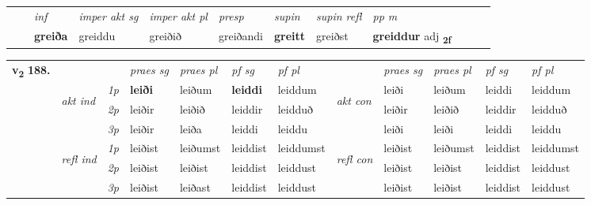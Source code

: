 \begin{tabular}{llllllllllll}
 & & \textit{inf} & \textit{imper akt sg} & \textit{imper akt pl}   & \textit{presp} & \textit{supin} & \textit{supin refl} & \textit{pp m}     \\*
  & & \textbf{greiða} & greiddu  & greiðið   & greiðandi &  \textbf{greitt} & greiðst & \textbf{greiddur} adj \textbf{\textsubscript{2f}} \\*
\cmidrule{1-12}
\end{tabular}



\begin{tabular}{llllllllllll} \toprule
\multirow{4}{*}{{{\textbf{v{\textsubscript{2}}} \Large{\textbf{188.}}}}}  & &   &  \textit{praes sg}  & \textit{praes pl}  &\textit{ pf sg} & \textit{pf pl} &  &  \textit{praes sg}  & \textit{praes pl}  & \textit{pf sg} & \textit{pf pl } \\*
	\cmidrule{4-7} \cmidrule{9-12}
 & \multirow{3}{*}{\begin{turn}{90}\textit{akt ind}\end{turn}} & {\textit{1p}} & \textbf{leiði} & leiðum    & \textbf{leiddi} & leiddum & \multirow{3}{*}{\begin{turn}{90}\textit{akt con}\end{turn}} &leiði & leiðum & leiddi & leiddum\\*
& &  {\textit{2p}} &  leiðir  & leiðið   & leiddir & leidduð & & leiðir & leiðið & leiddir & leidduð \\*
& &  {\textit{3p}} & leiðir & leiða   & leiddi & leiddu & & leiði & leiði& leiddi & leiddu  \\*
\cmidrule{4-7} \cmidrule{9-12}
 &\multirow{3}{*}{\begin{turn}{90}\textit{refl ind}\end{turn}} & {\textit{1p}} & leiðist & leiðumst    & leiddist & leiddumst & \multirow{3}{*}{\begin{turn}{90}\textit{refl con}\end{turn}}  &leiðist & leiðumst & leiddist & leiddumst\\*
 &&  {\textit{2p}} &  leiðist  & leiðist   & leiddist & leiddust & &leiðist & leiðist & leiddist & leiddust \\*
& &  {\textit{3p}} & leiðist & leiðast   & leiddist & leiddust & & leiðist & leiðist& leiddist & leiddust  \\*
\cmidrule{4-7} \cmidrule{9-12}
\end{tabular}


